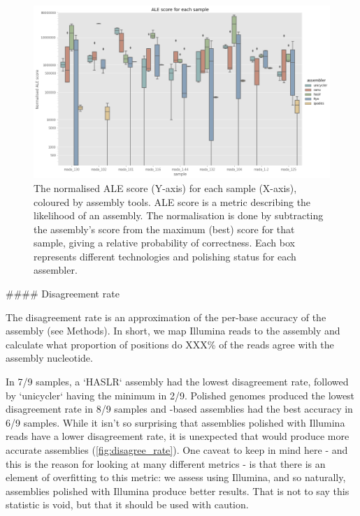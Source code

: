 \begin{figure}
\includegraphics[width=1.0\textwidth]{Chapter2/Figs/ale_score.png}
\centering
\caption{The normalised ALE score (Y-axis) for each sample (X-axis), coloured by assembly tools. ALE score is a metric describing the likelihood of an assembly. The normalisation is done by subtracting the assembly's score from the maximum (best) score for that sample, giving a relative probability of correctness. Each box represents different technologies and polishing status for each assembler.}
\label{fig:ale_score}
\end{figure}

\begin{markdown}

#### Disagreement rate

The disagreement rate is an approximation of the per-base accuracy of the assembly (see Methods). In short, we map Illumina reads to the assembly and calculate what proportion of positions do XXX\% of the reads agree with the assembly nucleotide.  

In 7/9 samples, a `HASLR` assembly had the lowest disagreement rate, followed by `unicycler` having the minimum in 2/9. Polished genomes produced the lowest disagreement rate in 8/9 samples and \ont{}-based assemblies had the best accuracy in 6/9 samples. While it isn't so surprising that assemblies polished with Illumina reads have a lower disagreement rate, it is unexpected that \ont{} would produce more accurate assemblies (\autoref{fig:disagree_rate}). One caveat to keep in mind here - and this is the reason for looking at many different metrics - is that there is an element of overfitting to this metric: we assess using Illumina, and so naturally, assemblies polished with Illumina produce better results. That is not to say this statistic is void, but that it should be used with caution.

\end{markdown}

